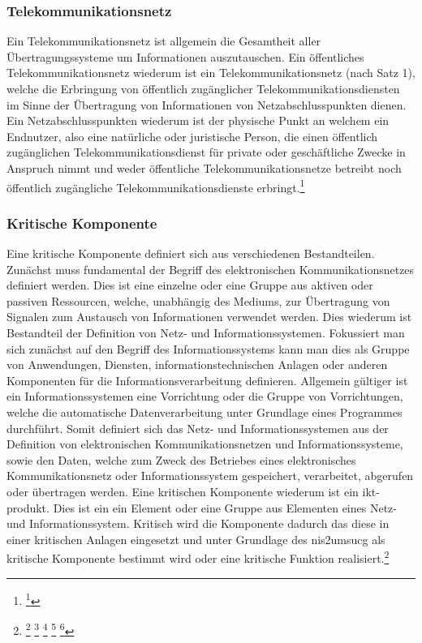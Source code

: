 \documentclass[11pt,a4paper,hidelinks]{article}   %
\begin{document}
            \subsubsection{Telekommunikationsnetz}
            Ein Telekommunikationsnetz ist allgemein die Gesamtheit aller Übertragungssysteme um Informationen auszutauschen. Ein öffentliches Telekommunikationsnetz wiederum ist ein Telekommunikationsnetz (nach Satz 1), welche die Erbringung von öffentlich zugänglicher Telekommunikationsdiensten im Sinne der Übertragung von Informationen von Netzabschlusspunkten dienen. Ein Netzabschlusspunkten wiederum ist der physische Punkt an welchem ein Endnutzer, also eine natürliche oder juristische Person, die einen öffentlich zugänglichen Telekommunikationsdienst für private oder geschäftliche Zwecke in Anspruch nimmt und weder öffentliche Telekommunikationsnetze betreibt noch öffentlich zugängliche Telekommunikationsdienste erbringt.\footnote{
                \footcite[Vgl. §3 Nummer 13, 32, 41, 42, 61 und 65][]{TKG}
            }

            \subsubsection{Kritische Komponente}
            Eine kritische Komponente definiert sich aus verschiedenen Bestandteilen. Zunächst muss fundamental der Begriff des elektronischen Kommunikationsnetzes definiert werden. Dies ist eine einzelne oder eine Gruppe aus aktiven oder passiven Ressourcen, welche, unabhängig des Mediums, zur Übertragung von Signalen zum Austausch von Informationen verwendet werden. Dies wiederum ist Bestandteil der Definition von Netz- und Informationssystemen. Fokussiert man sich zunächst auf den Begriff des Informationssystems kann man dies als Gruppe von Anwendungen, Diensten, informationstechnischen Anlagen oder anderen Komponenten für die Informationsverarbeitung definieren. Allgemein gültiger ist ein Informationssystemen eine Vorrichtung oder die Gruppe von Vorrichtungen, welche die automatische Datenverarbeitung unter Grundlage eines Programmes durchführt. Somit definiert sich das Netz- und Informationssystemen aus der Definition von elektronischen Kommunikationsnetzen und Informationssysteme, sowie den Daten, welche zum Zweck des Betriebes eines elektronisches Kommunikationsnetz oder Informationssystem gespeichert, verarbeitet, abgerufen oder übertragen werden. Eine kritischen Komponente wiederum ist ein \gls{ikt-produkt}. Dies ist ein ein Element oder eine Gruppe aus Elementen eines Netz- und Informationssystem. Kritisch wird die Komponente dadurch das diese in einer kritischen Anlagen eingesetzt und unter Grundlage des \gls{nis2umsucg} als kritische Komponente bestimmt wird oder eine kritische Funktion realisiert.\footnote{
                \footcite[Vgl. §2 Nummer 23][]{NIS2UmsuCG}
                \footcite[Vgl. Artikel 4, Nummer 1][]{EU2016-1148}
                \footcite[Vgl. Artikel 2, Buchstabe a][]{EU2002-21-EG}
                \footcite[Vgl. Artikel 2, Nummer 12][]{EU2019-881}
                \footcite[Vgl. S. 5][]{iso27000-2018}
            }
\end{document}
